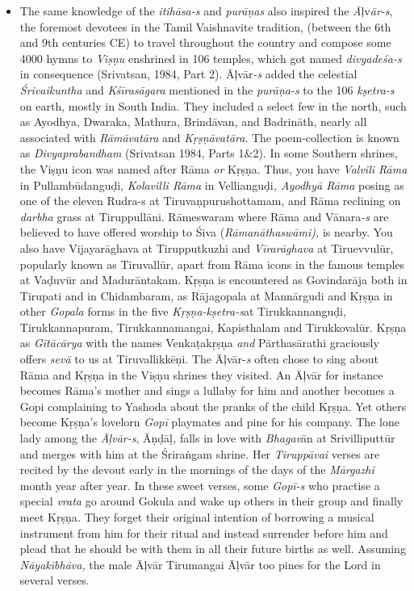 \begin{itemize}
\item The same knowledge of the \textit{itihāsa-s} and \textit{purāņas} also inspired the \textit{Ā}ļv\textit{ār-s}, the foremost devotees in the Tamil Vaishnavite tradition, (between the 6th and 9th centuries CE) to travel throughout the country and compose some 4000 hymns to \textit{Viṣṇu} enshrined in 106 temples, which got named \textit{divyadeśa-s} in consequence (Srivatsan, 1984, Part 2). Āļvār\textit{-s} added the celestial \textit{Śrivaikuntha} and \textit{Kśīrasāgara} mentioned in the \textit{purāṇa-s} to the 106 \textit{kṣetra-s} on earth, mostly in South India. They included a select few in the north, such as Ayodhya, Dwaraka, Mathura, Brindāvan, and Badrināth, nearly all associated with \textit{Rāmāvatāra} and \textit{Kṛṣṇāvatāra}. The poem-collection is known as \textit{Divyaprabandham} (Srivatsan 1984, Parts 1\&2). In some Southern shrines, the Viṣṇu icon was named after Rāma\textit{ or} Kṛṣṇa. Thus, you have \textit{Valvili Rāma} in Pullambūdanguḍi, \textit{Kolavilli Rāma} in Vellianguḍi\textit{, Ayodhyā Rāma} posing as one of the eleven Rudra-s at Tiruvaṇpurushottamam, and Rāma reclining on \textit{darbha} grass at Tiruppullāni. Rāmeswaram where Rāma and Vānara\textit{-s} are believed to have offered worship to Śiva (\textit{Rāmanāthaswāmi),} is nearby. You also have Vijayarāghava at Tirupputkuzhi and \textit{Vīrarāghava} at Tiruevvulūr, popularly known as Tiruvallūr, apart from Rāma icons in the famous temples at Vaḍuvūr and Madurāntakam. Kṛṣṇa is encountered as Govindarāja both in Tirupati and in Chidambaram, as Rājagopala at Mannārgudi and Kṛṣṇa in other \textit{Gopala} forms in the five \textit{Kṛṣṇa-kṣetra-s}\break at Tirukkannanguḍi, Tirukkannapuram, Tirukkannamangai, Kapisthalam and Tirukkovalūr. Kṛṣṇa as \textit{Gītācārya} with the names Venkaṭakṛṣṇa\textit{ and} Pārthasārathi graciously offers \textit{sevā} to us at Tiruvallikkēṇi. The Āļvār-\textit{s} often chose to sing about Rāma and Kṛṣṇa in the Viṣṇu shrines they visited\textit{.} An Āļvār for instance becomes Rāma’s mother and sings a lullaby for him and another becomes a Gopi complaining to Yashoda about the pranks of the child Kṛṣṇa. Yet others become Kṛṣṇa’s lovelorn \textit{Gopī} playmates and pine for his company. The lone lady among the \textit{Āļvār-s}, Āṇḍāḷ\textit{,} falls in love with \textit{Bhagav}ān at Srivilliputtūr and merges with him at the Śriraṅgam shrine. Her \textit{Tiruppāvai} verses are recited by the devout early in the mornings of the days of the \textit{Mārgazhi} month year after year. In these sweet verses, some \textit{Gopī-s} who practise a special \textit{vrata} go around Gokula and wake up others in their group and finally meet Kṛṣṇa\textit{.} They forget their original intention of borrowing a musical instrument from him for their ritual and instead surrender before him and plead that he should be with them in all their future births as well. Assuming \textit{Nāyakībhāva,} the male Āļvār Tirumangai Āļvār too pines for the Lord in several verses.


\end{itemize}
